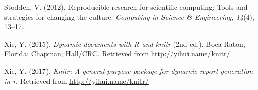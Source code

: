 \documentclass[english,man]{apa6}
\theoremstyle{definition}
\theoremstyle{definition}
\theoremstyle{definition}
\theoremstyle{remark}
\begin{document}
\leavevmode\hypertarget{ref-stodden2012}{}%
Stodden, V. (2012). Reproducible research for scientific computing:
Tools and strategies for changing the culture. \emph{Computing in
Science \& Engineering}, \emph{14}(4), 13--17.

\leavevmode\hypertarget{ref-knitr}{}%
Xie, Y. (2015). \emph{Dynamic documents with R and knitr} (2nd ed.).
Boca Raton, Florida: Chapman; Hall/CRC. Retrieved from
\url{http://yihui.name/knitr/}

\leavevmode\hypertarget{ref-knitrmanual}{}%
Xie, Y. (2017). \emph{Knitr: A general-purpose package for dynamic
report generation in r}. Retrieved from \url{http://yihui.name/knitr/}
\end{document}
